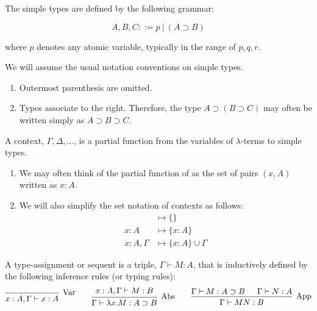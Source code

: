 \cite{Barendregt2013}

\begin{definition}
  The simple types are defined by the following grammar:
  
  \[
    A, B, C ::= p \ | \ (A \supset B)
  \]
  
  where $p$ denotes any atomic variable, typically in the range of $p, q, r$.
\end{definition}

\begin{notation}
  We will assume the usual notation conventions on simple types. 
  \begin{enumerate}
  \item Outermost parenthesis are omitted.
  \item Types associate to the right. Therefore, the type $A \supset (B \supset C)$ may often be written simply as $A \supset B \supset C$.
  \end{enumerate}
\end{notation}

\begin{definition}[Context]
  A context, $\Gamma, \Delta, \dots$, is a partial function from the variables of $\lambda$-terms to simple types.
\end{definition}

\begin{notation} \hfill
  \begin{enumerate}
  \item We may often think of the partial function of as the set of pairs $(x, A)$ written as $x:A$.
  \item We will also simplify the set notation of contexts as follows:
    \begin{align*}
      &\mapsto \{ \} \\
      x:A         &\mapsto \{ x:A \} \\
      x:A, \Gamma &\mapsto \{ x:A \} \cup \Gamma
    \end{align*}
  \end{enumerate}
\end{notation}

\begin{definition}
  A type-assignment or sequent is a triple, $\Gamma \vdash M:A$, that is inductively defined by the following inference rules (or typing rules):
  \[
    \begin{prooftree}
      \infer0[Var]{ x:A, \Gamma \vdash x:A } 
    \end{prooftree}
    \qquad
    \begin{prooftree}
      \hypo{ x:A, \Gamma \vdash M:B }
      \infer1[Abs]{ \Gamma \vdash \lambda x . M : A \supset B  } 
    \end{prooftree}
    \qquad
    \begin{prooftree}
      \hypo{ \Gamma \vdash M : A \supset B }
      \hypo{ \Gamma \vdash N : A }	
      \infer2[App]{ \Gamma \vdash M N : B } 
    \end{prooftree}
  \]
\end{definition}

